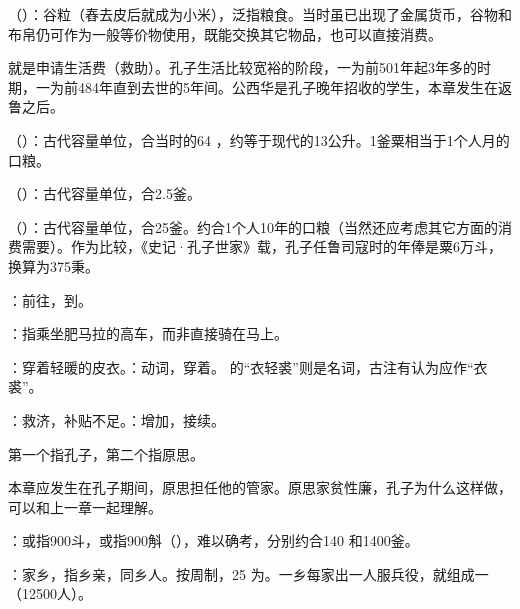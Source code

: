 {
\item {}（）：谷粒（舂去皮后就成为小米），泛指粮食。当时虽已出现了金属货币，谷物和布帛仍可作为一般等价物使用，既能交换其它物品，也可以直接消费。

就是申请生活费（救助）。孔子生活比较宽裕的阶段，一为前501年起3年多的时期，一为前484年直到去世的5年间。公西华是孔子晚年招收的学生，本章发生在返鲁之后。

\item {}（）：古代容量单位，合当时的64 ，约等于现代的13公升。1釜粟相当于1个人月的口粮。

（）：古代容量单位，合2.5釜。

（）：古代容量单位，合25釜。约合1个人10年的口粮（当然还应考虑其它方面的消费需要）。作为比较，《史记·孔子世家》载，孔子任鲁司寇时的年俸是粟6万斗，换算为375秉。

\item {}：前往，到。

\item {}：指乘坐肥马拉的高车，而非直接骑在马上。

\item {}：穿着轻暖的皮衣。：动词，穿着。 的“衣轻裘”则是名词，古注有认为应作“衣裘”。

\item {}：救济，补贴不足。：增加，接续。
}
{}


{
\item 第一个指孔子，第二个指原思。

本章应发生在孔子期间，原思担任他的管家。原思家贫性廉，孔子为什么这样做，可以和上一章一起理解。

\item {}：或指900斗，或指900斛（），难以确考，分别约合140 和1400釜。
\item {}：家乡，指乡亲，同乡人。按周制，25 为。一乡每家出一人服兵役，就组成一（12500人）。
}
{}


